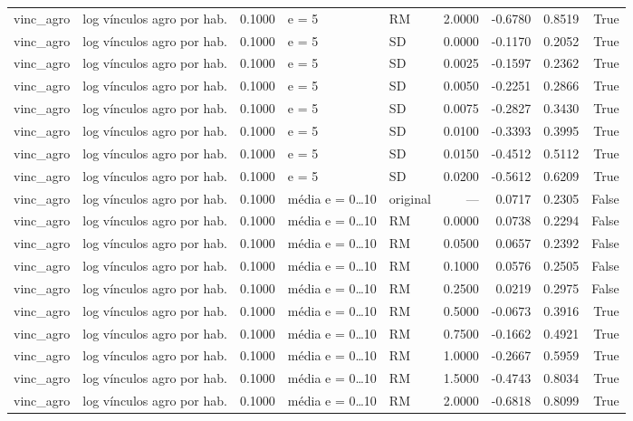 \begin{table}
{\begin{tabular}{llrllrrrr}
vinc\_agro & log vínculos agro por hab. & 0.1000 & e = 5 & RM & 2.0000 & -0.6780 & 0.8519 & True \\
vinc\_agro & log vínculos agro por hab. & 0.1000 & e = 5 & SD & 0.0000 & -0.1170 & 0.2052 & True \\
vinc\_agro & log vínculos agro por hab. & 0.1000 & e = 5 & SD & 0.0025 & -0.1597 & 0.2362 & True \\
vinc\_agro & log vínculos agro por hab. & 0.1000 & e = 5 & SD & 0.0050 & -0.2251 & 0.2866 & True \\
vinc\_agro & log vínculos agro por hab. & 0.1000 & e = 5 & SD & 0.0075 & -0.2827 & 0.3430 & True \\
vinc\_agro & log vínculos agro por hab. & 0.1000 & e = 5 & SD & 0.0100 & -0.3393 & 0.3995 & True \\
vinc\_agro & log vínculos agro por hab. & 0.1000 & e = 5 & SD & 0.0150 & -0.4512 & 0.5112 & True \\
vinc\_agro & log vínculos agro por hab. & 0.1000 & e = 5 & SD & 0.0200 & -0.5612 & 0.6209 & True \\
vinc\_agro & log vínculos agro por hab. & 0.1000 & média e = 0…10 & original & — & 0.0717 & 0.2305 & False \\
vinc\_agro & log vínculos agro por hab. & 0.1000 & média e = 0…10 & RM & 0.0000 & 0.0738 & 0.2294 & False \\
vinc\_agro & log vínculos agro por hab. & 0.1000 & média e = 0…10 & RM & 0.0500 & 0.0657 & 0.2392 & False \\
vinc\_agro & log vínculos agro por hab. & 0.1000 & média e = 0…10 & RM & 0.1000 & 0.0576 & 0.2505 & False \\
vinc\_agro & log vínculos agro por hab. & 0.1000 & média e = 0…10 & RM & 0.2500 & 0.0219 & 0.2975 & False \\
vinc\_agro & log vínculos agro por hab. & 0.1000 & média e = 0…10 & RM & 0.5000 & -0.0673 & 0.3916 & True \\
vinc\_agro & log vínculos agro por hab. & 0.1000 & média e = 0…10 & RM & 0.7500 & -0.1662 & 0.4921 & True \\
vinc\_agro & log vínculos agro por hab. & 0.1000 & média e = 0…10 & RM & 1.0000 & -0.2667 & 0.5959 & True \\
vinc\_agro & log vínculos agro por hab. & 0.1000 & média e = 0…10 & RM & 1.5000 & -0.4743 & 0.8034 & True \\
vinc\_agro & log vínculos agro por hab. & 0.1000 & média e = 0…10 & RM & 2.0000 & -0.6818 & 0.8099 & True \\

\end{tabular}}
\end{table}
